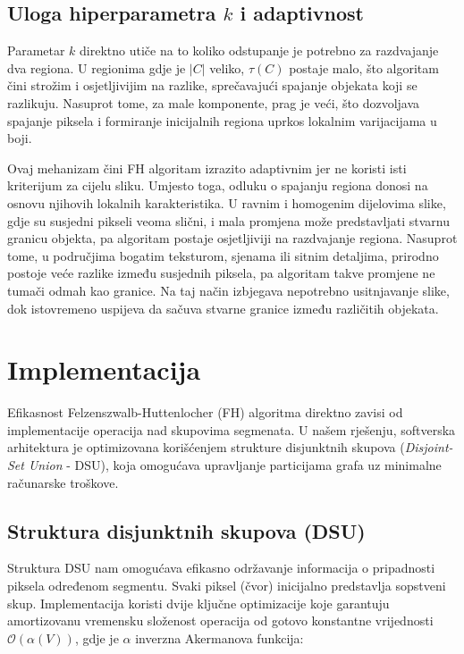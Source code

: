 \documentclass[11pt,a4paper]{article}
\begin{document}
\subsection{Uloga hiperparametra $k$ i adaptivnost}
Parametar $k$ direktno utiče na to koliko odstupanje je potrebno za razdvajanje dva regiona. U regionima gdje je $|C|$ veliko, $\tau(C)$ postaje malo, što algoritam čini strožim i osjetljivijim na razlike, sprečavajući spajanje objekata koji se razlikuju. Nasuprot tome, za male komponente, prag je veći, što dozvoljava spajanje piksela i formiranje inicijalnih regiona uprkos lokalnim varijacijama u boji.

Ovaj mehanizam čini FH algoritam izrazito adaptivnim jer ne koristi isti kriterijum za cijelu sliku. Umjesto toga, odluku o spajanju regiona donosi na osnovu njihovih lokalnih karakteristika. U ravnim i homogenim dijelovima slike, gdje su susjedni pikseli veoma slični, i mala promjena može predstavljati stvarnu granicu objekta, pa algoritam postaje osjetljiviji na razdvajanje regiona. Nasuprot tome, u područjima bogatim teksturom, sjenama ili sitnim detaljima, prirodno postoje veće razlike između susjednih piksela, pa algoritam takve promjene ne tumači odmah kao granice. Na taj način izbjegava nepotrebno usitnjavanje slike, dok istovremeno uspijeva da sačuva stvarne granice između različitih objekata.


\section{Implementacija}

Efikasnost Felzenszwalb-Huttenlocher (FH) algoritma direktno zavisi od implementacije operacija nad skupovima segmenata. U našem rješenju, softverska arhitektura je optimizovana korišćenjem strukture disjunktnih skupova (\textit{Disjoint-Set Union} - DSU), koja omogućava upravljanje particijama grafa uz minimalne računarske troškove.

\subsection{Struktura disjunktnih skupova (DSU)}
Struktura DSU nam omogućava efikasno održavanje informacija o pripadnosti piksela određenom segmentu. Svaki piksel (čvor) inicijalno predstavlja sopstveni skup. Implementacija koristi dvije ključne optimizacije koje garantuju amortizovanu vremensku složenost operacija od gotovo konstantne vrijednosti $\mathcal{O}(\alpha(V))$, gdje je $\alpha$ inverzna Akermanova funkcija:
\end{document}
